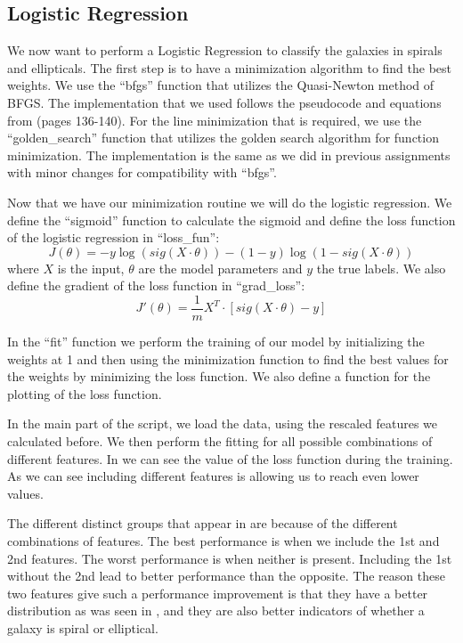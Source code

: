 \documentclass[a4paper,10pt]{article}
\begin{document}
\subsection{Logistic Regression}

We now want to perform a Logistic Regression to classify the galaxies in spirals and ellipticals. The first step is to have a minimization algorithm to find the best weights. We use the ``bfgs'' function that utilizes the Quasi-Newton method of BFGS. The implementation that we used follows the pseudocode and equations from  (pages 136-140). For the line minimization that is required, we use the ``golden\_search'' function that utilizes the golden search algorithm for function minimization. The implementation is the same as we did in previous assignments with minor changes for compatibility with ``bfgs''.

Now that we have our minimization routine we will do the logistic regression. We define the ``sigmoid'' function to calculate the sigmoid and define the loss function of the logistic regression in ``loss\_fun'':
\begin{equation}
  J(\theta) = -y \log(sig(X \cdot \theta)) - (1-y) \log(1-sig(X \cdot \theta))
\end{equation}
where $X$ is the input, $\theta$ are the model parameters and $y$ the true labels. We also define the gradient of the loss function in ``grad\_loss'':
\begin{equation}
  J'(\theta) = \frac{1}{m} X^T \cdot [sig(X \cdot \theta)-y]
\end{equation}

In the ``fit'' function we perform the training of our model by initializing the weights at 1 and then using the minimization function to find the best values for the weights by minimizing the loss function. We also define a function for the plotting of the loss function. 



In the main part of the script, we load the data, using the rescaled features we calculated before. We then perform the fitting for all possible combinations of different features. In  we can see the value of the loss function during the training. As we can see including different features is allowing us to reach even lower values. 

The different distinct groups that appear in  are because of the different combinations of features. The best performance is when we include the 1st and 2nd features. The worst performance is when neither is present. Including the 1st without the 2nd lead to better performance than the opposite. The reason these two features give such a performance improvement is that they have a better distribution as was seen in , and they are also better indicators of whether a galaxy is spiral or elliptical.
\end{document}
